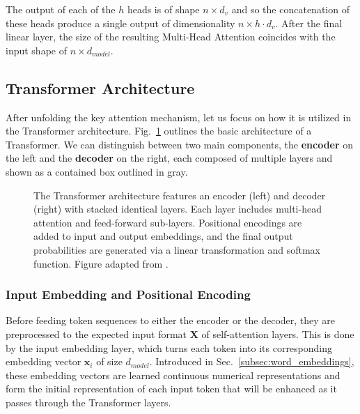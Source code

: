 The output of each of the $h$ heads is of shape $n \times d_v$ and so the
concatenation of these heads produce a single output of dimensionality $n \times
h \cdot d_v$. After the final linear layer, the size of the resulting Multi-Head
Attention coincides with the input shape of $n \times d_{model}$.

\subsection{Transformer Architecture} \label{sec:architecture}

After unfolding the key attention mechanism, let us focus on how it is utilized
in the Transformer architecture. Fig.~\ref{fig:transformer} outlines the basic
architecture of a Transformer. We can distinguish between two main components,
the \textbf{encoder} on the left and the \textbf{decoder} on the right, each
composed of multiple layers and shown as a contained box outlined in gray.

\begin{figure}[!htb]
    \centering
    \resizebox*{.6\textwidth}{!}{}
    \caption[Illustration of the Transformer architecture]{The Transformer
    architecture features an encoder (left) and decoder (right) with stacked
    identical layers. Each layer includes multi-head attention and feed-forward
    sub-layers. Positional encodings are added to input and output embeddings,
    and the final output probabilities are generated via a linear transformation
    and softmax function. Figure adapted from \cite{vaswani2017attention}.} 
    \label{fig:transformer}
\end{figure}

\subsubsection{Input Embedding and Positional Encoding} \label{subsec:input_emb}
Before feeding token sequences to either the encoder or the decoder, they are
preprocessed to the expected input format $\bm{X}$ of self-attention layers.
This is done by the input embedding layer, which turns each token into its
corresponding embedding vector $\bm{x}_i$ of size $d_{model}$. Introduced in
Sec.~\ref{subsec:word_embeddings}, these embedding vectors are learned
continuous numerical representations and form the initial representation of each
input token that will be enhanced as it passes through the Transformer layers.

